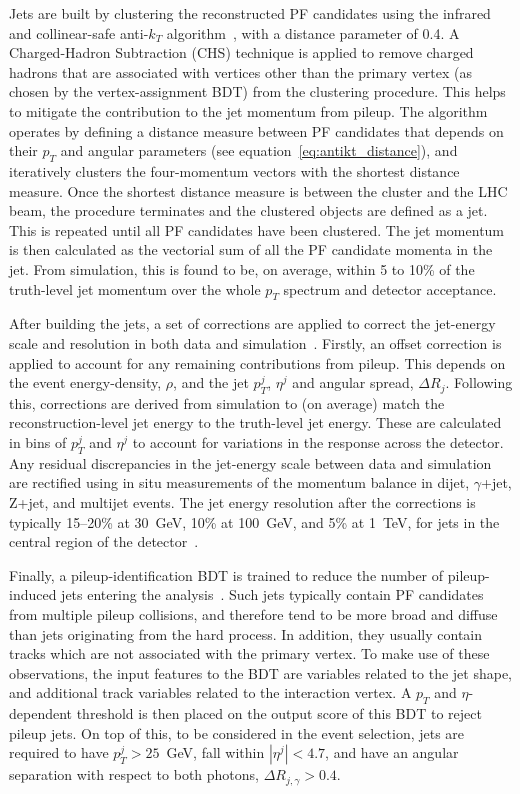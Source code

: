 Jets are built by clustering the reconstructed PF candidates using the infrared and collinear-safe anti-$k_T$ algorithm~\cite{Cacciari:2008gp,Cacciari:2011ma}, with a distance parameter of 0.4. A Charged-Hadron Subtraction (CHS) technique is applied to remove charged hadrons that are associated with vertices other than the primary vertex (as chosen by the vertex-assignment BDT) from the clustering procedure. This helps to mitigate the contribution to the jet momentum from pileup. The algorithm operates by defining a distance measure between PF candidates that depends on their $p_T$ and angular parameters (see equation~\ref{eq:antikt_distance}), and iteratively clusters the four-momentum vectors with the shortest distance measure. Once the shortest distance measure is between the cluster and the LHC beam, the procedure terminates and the clustered objects are defined as a jet. This is repeated until all PF candidates have been clustered. The jet momentum is then calculated as the vectorial sum of all the PF candidate momenta in the jet. From simulation, this is found to be, on average, within 5 to 10\% of the truth-level jet momentum over the whole $p_T$ spectrum and detector acceptance.

After building the jets, a set of corrections are applied to correct the jet-energy scale and resolution in both data and simulation~\cite{Khachatryan:2016kdb}. Firstly, an offset correction is applied to account for any remaining contributions from pileup. This depends on the event energy-density, $\rho$, and the jet $p_T^j$, $\eta^j$ and angular spread, $\Delta R_j$. Following this, corrections are derived from simulation to (on average) match the reconstruction-level jet energy to the truth-level jet energy. These are calculated in bins of $p_T^j$ and $\eta^j$ to account for variations in the response across the detector. Any residual discrepancies in the jet-energy scale between data and simulation are rectified using in situ measurements of the momentum balance in dijet, $\gamma$+jet, Z+jet, and multijet events. The jet energy resolution after the corrections is typically 15--20\% at 30~GeV, 10\% at 100~GeV, and 5\% at 1~TeV, for jets in the central region of the detector~\cite{Khachatryan:2016kdb}.

Finally, a pileup-identification BDT is trained to reduce the number of pileup-induced jets entering the analysis~\cite{Sirunyan:2020foa}. Such jets typically contain PF candidates from multiple pileup collisions, and therefore tend to be more broad and diffuse than jets originating from the hard process. In addition, they usually contain tracks which are not associated with the primary vertex. To make use of these observations, the input features to the BDT are variables related to the jet shape, and additional track variables related to the interaction vertex. A $p_T$ and $\eta$-dependent threshold is then placed on the output score of this BDT to reject pileup jets. On top of this, to be considered in the event selection, jets are required to have $p_T^j>25$~GeV, fall within $|\eta^j|<4.7$, and have an angular separation with respect to both photons, $\Delta R_{j,\gamma}>0.4$.

